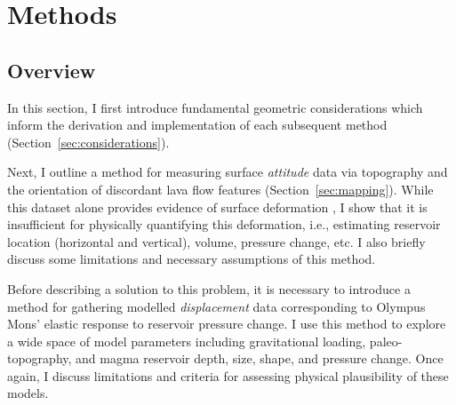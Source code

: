 \chapter{Methods}\label{cha:methods}

\section{Overview}

In this section, I first introduce fundamental geometric considerations which inform the derivation and implementation of each subsequent method (Section~\ref{sec:considerations}).

Next, I outline a method for measuring surface \emph{attitude} data via topography and the orientation of discordant lava flow features (Section~\ref{sec:mapping}). While this dataset alone provides evidence of surface deformation \parencite[c.f.][]{mouginis-mark_late-stage_2019}, I show that it is insufficient for physically quantifying this deformation, i.e., estimating reservoir location (horizontal and vertical), volume, pressure change, etc. I also briefly discuss some limitations and necessary assumptions of this method. 

Before describing a solution to this problem, it is necessary to introduce a method for gathering modelled \emph{displacement} data corresponding to Olympus Mons' elastic response to reservoir pressure change. I use this method to explore a wide space of model parameters including gravitational loading, paleo-topography, and magma reservoir depth, size, shape, and pressure change. Once again, I discuss limitations and criteria for assessing physical plausibility of these models.

